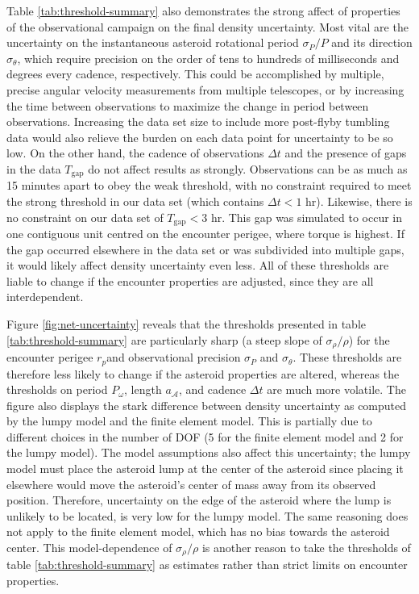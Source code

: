 \documentclass[fleqn,usenatbib]{mnras}
\begin{document}
Table \ref{tab:threshold-summary} also demonstrates the strong affect of properties of the observational campaign on the final density uncertainty. Most vital are the uncertainty on the instantaneous asteroid rotational period $\sigma_P / P$ and its direction $\sigma_\theta$, which require precision on the order of tens to hundreds of milliseconds and degrees every cadence, respectively. This could be accomplished by multiple, precise angular velocity measurements from multiple telescopes, or by increasing the time between observations to maximize the change in period between observations. Increasing the data set size to include more post-flyby tumbling data would also relieve the burden on each data point for uncertainty to be so low. On the other hand, the cadence of observations $\Delta t$ and the presence of gaps in the data $T_\text{gap}$ do not affect results as strongly. Observations can be as much as 15 minutes apart to obey the weak threshold, with no constraint required to meet the strong threshold in our data set (which contains $\Delta t < 1$ hr). Likewise, there is no constraint on our data set of $T_\text{gap} < 3$ hr. This gap was simulated to occur in one contiguous unit centred on the encounter perigee, where torque is highest. If the gap occurred elsewhere in the data set or was subdivided into multiple gaps, it would likely affect density uncertainty even less. All of these thresholds are liable to change if the encounter properties are adjusted, since they are all interdependent.

Figure \ref{fig:net-uncertainty} reveals that the thresholds presented in table \ref{tab:threshold-summary} are particularly sharp (a steep slope of $\sigma_\rho / \rho$) for the encounter perigee $r_p$and observational precision $\sigma_P$ and $\sigma_\theta$. These thresholds are therefore less likely to change if the asteroid properties are altered, whereas the thresholds on period $P_\omega$, length $a_\mathcal{A}$, and cadence $\Delta t$ are much more volatile. The figure also displays the stark difference between density uncertainty as computed by the lumpy model and the finite element model. This is partially due to different choices in the number of DOF (5 for the finite element model and 2 for the lumpy model). The model assumptions also affect this uncertainty; the lumpy model must place the asteroid lump at the center of the asteroid since placing it elsewhere would move the asteroid's center of mass away from its observed position. Therefore, uncertainty on the edge of the asteroid where the lump is unlikely to be located, is very low for the lumpy model. The same reasoning does not apply to the finite element model, which has no bias towards the asteroid center. This model-dependence of $\sigma_\rho / \rho$ is another reason to take the thresholds of table \ref{tab:threshold-summary} as estimates rather than strict limits on encounter properties.
\end{document}
